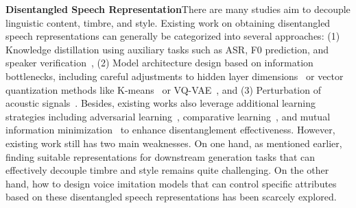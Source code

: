 \textbf{Disentangled Speech Representation}\quad There are many studies aim to decouple linguistic content, timbre, and style. Existing work on obtaining disentangled speech representations can generally be categorized into several approaches: (1) Knowledge distillation using auxiliary tasks such as ASR, F0 prediction, and speaker verification~\cite{speech-resynthesis-interspeech21,ns3,basetts}, (2) Model architecture design based on information bottlenecks, including careful adjustments to hidden layer dimensions~\cite{autovc,speechsplit} or vector quantization methods like K-means~\cite{HuBERT,softvc,sef-vc-kmeans} or VQ-VAE~\cite{vq-vae,vqvc,vq-content-style,speech-resynthesis-interspeech21,ns3}, and (3) Perturbation of acoustic signals~\cite{nancy,nancypp,speechsplit2}. Besides, existing works also leverage additional learning strategies including adversarial learning~\cite{ns3,basetts}, comparative learning~\cite{contentvec,basetts}, and mutual information minimization~\cite{vq-content-style,mutual-information-zhuxinfa,mutual-information} to enhance disentanglement effectiveness. However, existing work still has two main weaknesses. On one hand, as mentioned earlier, finding suitable representations for downstream generation tasks that can effectively decouple timbre and style remains quite challenging. On the other hand, how to design voice imitation models that can control specific attributes based on these disentangled speech representations has been scarcely explored.